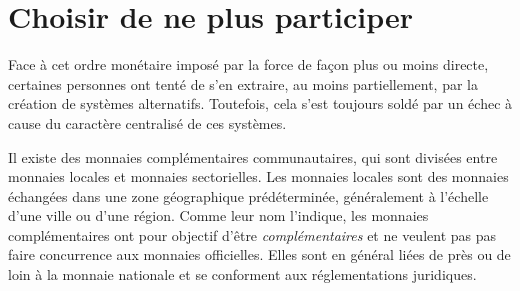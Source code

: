 
\section*{Choisir de ne plus participer} %

Face à cet ordre monétaire imposé par la force de façon plus ou moins directe, certaines personnes ont tenté de s'en extraire, au moins partiellement, par la création de systèmes alternatifs. Toutefois, cela s'est toujours soldé par un échec à cause du caractère centralisé de ces systèmes.




Il existe des monnaies complémentaires communautaires, qui sont divisées entre monnaies locales et monnaies sectorielles. Les monnaies locales sont des monnaies échangées dans une zone géographique prédéterminée, généralement à l'échelle d'une ville ou d'une région. Comme leur nom l'indique, les monnaies complémentaires ont pour objectif d'être \emph{complémentaires} et ne veulent pas pas faire concurrence aux monnaies officielles. Elles sont en général liées de près ou de loin à la monnaie nationale et se conforment aux réglementations juridiques.

